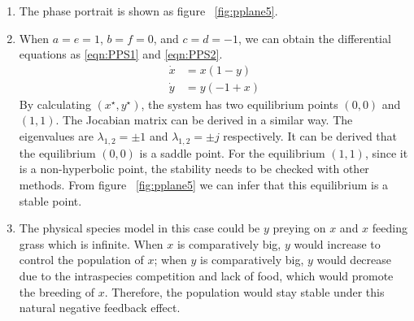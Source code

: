 \begin{enumerate}

\item The phase portrait is shown as figure ~\ref{fig:pplane5}.
\item When 
$a=e=1$, $b=f=0$, and $c=d=-1$,
  we can obtain the differential equations as \eqref{eqn:PPS1} and \eqref{eqn:PPS2}.
\begin{subequations} \label{eqn:PPS}
\begin{align}
    \dot{x} &= x(1-y)  \label{eqn:PPS1}\\ 
    \dot{y} &= y(-1+x) \label{eqn:PPS2}
\end{align}
\end{subequations}
By calculating $(x^\star,y^\star)$, the system has two equilibrium points $(0,0)$ and $(1,1)$. The Jocabian matrix can be derived in a similar way. The eigenvalues are $\lambda_{1,2} = \pm 1$ and $\lambda_{1,2} = \pm j$ respectively. It can be derived that the equilibrium $(0,0)$ is a saddle point. For the equilibrium $(1,1)$, since it is a non-hyperbolic point, the stability needs to be checked with other methods. From figure ~\ref{fig:pplane5} we can infer that this equilibrium is a stable point. 
\item The physical species model in this case could be $y$ preying on $x$ and $x$ feeding grass which is infinite. When $x$ is comparatively big, $y$ would increase to control the population of $x$; when $y$ is comparatively big, $y$ would decrease due to the intraspecies competition and lack of food, which would promote the breeding of $x$. Therefore, the population would stay stable under this natural negative feedback effect.  
\end{enumerate}
